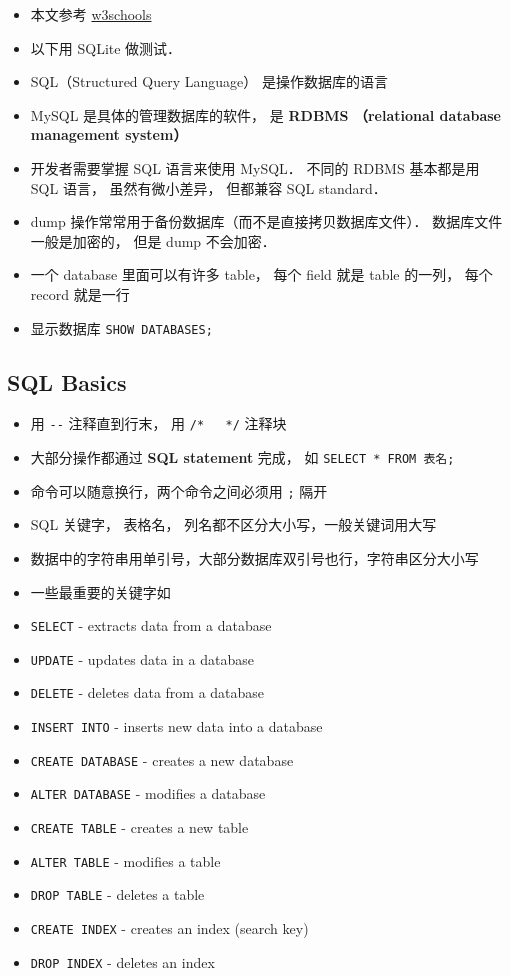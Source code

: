 
\begin{issues}
\issueDraft
\end{issues}

\begin{itemize}
\item 本文参考 \href{https://www.w3schools.com/sql/default.asp}{w3schools}
\item 以下用 SQLite 做测试．
\item SQL（Structured Query Language） 是操作数据库的语言
\item MySQL 是具体的管理数据库的软件， 是 \textbf{RDBMS （relational database management system）}
\item 开发者需要掌握 SQL 语言来使用 MySQL． 不同的 RDBMS 基本都是用 SQL 语言， 虽然有微小差异， 但都兼容 SQL standard．
\item dump 操作常常用于备份数据库（而不是直接拷贝数据库文件）． 数据库文件一般是加密的， 但是 dump 不会加密．
\item 一个 database 里面可以有许多 table， 每个 field 就是 table 的一列， 每个 record 就是一行
\item 显示数据库 \verb`SHOW DATABASES;`
\end{itemize}

\subsection{SQL Basics}
\begin{itemize}
\item 用 \verb|--| 注释直到行末， 用 \verb|/*   */| 注释块
\item 大部分操作都通过 \textbf{SQL statement} 完成， 如 \verb`SELECT * FROM 表名;`
\item 命令可以随意换行，两个命令之间必须用 \verb|;| 隔开
\item SQL 关键字， 表格名， 列名都不区分大小写，一般关键词用大写
\item 数据中的字符串用单引号，大部分数据库双引号也行，字符串区分大小写
\item 一些最重要的关键字如
\item \verb`SELECT` - extracts data from a database
\item \verb`UPDATE` - updates data in a database
\item \verb`DELETE` - deletes data from a database
\item \verb`INSERT INTO` - inserts new data into a database
\item \verb`CREATE DATABASE` - creates a new database
\item \verb`ALTER DATABASE` - modifies a database
\item \verb`CREATE TABLE` - creates a new table
\item \verb`ALTER TABLE` - modifies a table
\item \verb`DROP TABLE` - deletes a table
\item \verb`CREATE INDEX` - creates an index (search key)
\item \verb`DROP INDEX` - deletes an index
\end{itemize}

